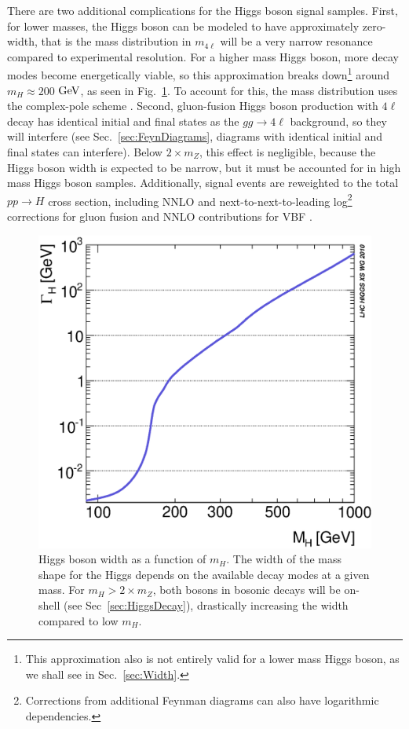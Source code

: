 There are two additional complications for the Higgs boson signal samples. First, for lower masses, the Higgs boson can be modeled to have approximately zero-width, that is the mass distribution in $m_{4\ell}$ will be a very narrow resonance compared to experimental resolution. For a higher mass Higgs boson, more decay modes become energetically viable, so this approximation breaks down\footnote{This approximation also is not entirely valid for a lower mass Higgs boson, as we shall see in Sec.~\ref{sec:Width}.} around $m_H \approx 200$ $\rm{GeV}$, as seen in Fig.~\ref{fig:HiggsWidth}. To account for this, the mass distribution uses the complex-pole scheme \cite{Passarino:2010qk,Goria:2011wa,Kauer:2012hd}. Second, gluon-fusion Higgs boson production with $4\ell$ decay has identical initial and final states as the $gg\rightarrow 4\ell$ background, so they will interfere (see Sec.~\ref{sec:FeynDiagrams}, diagrams with identical initial and final states can interfere). Below $2\times m_Z$, this effect is negligible, because the Higgs boson width is expected to be narrow, but it must be accounted for in high mass Higgs boson samples. Additionally, signal events are reweighted to the total $pp\rightarrow H$ cross section, including NNLO and next-to-next-to-leading log\footnote{Corrections from additional Feynman diagrams can also have logarithmic dependencies.} corrections for gluon fusion \cite{deFlorian:2012mx,Anastasiou:2008tj,deFlorian:2009hc,Baglio:2010ae,HXSWG_Observables,Djouadi:1991tka,Dawson:1990zj,Spira:1995rr,Harlander:2002wh,Anastasiou:2002yz,Ravindran:2003um,Catani:2003zt,Actis:2008ug} and NNLO contributions for VBF \cite{HXSWG_Observables,Ciccolini:2007jr,Ciccolini:2007ec,Figy:2003nv,Arnold:2008rz,Bolzoni:2010xr}.

\begin{figure}[htbp]
\begin{center}
\includegraphics[width=.5\linewidth]{HiggsDiscovery/figures/HiggsWidth}
\caption[Higgs Width as a Function of $m_H$]{Higgs boson width as a function of $m_H$. The width of the mass shape for the Higgs depends on the available decay modes at a given mass. For $m_H > 2\times m_Z$, both bosons in bosonic decays will be on-shell (see Sec~\ref{sec:HiggsDecay}), drastically increasing the width compared to low $m_H$.}
\label{fig:HiggsWidth}
\end{center}
\end{figure}


